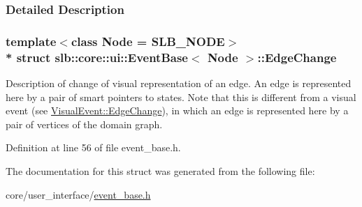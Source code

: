 \subsubsection{Detailed Description}
\subsubsection*{template$<$class Node = S\+L\+B\+\_\+\+N\+O\+DE$>$\\*
struct slb\+::core\+::ui\+::\+Event\+Base$<$ Node $>$\+::\+Edge\+Change}

Description of change of visual representation of an edge. An edge is represented here by a pair of smart pointers to states. Note that this is different from a visual event (see \hyperlink{structslb_1_1core_1_1ui_1_1VisualEvent_1_1EdgeChange}{Visual\+Event\+::\+Edge\+Change}), in which an edge is represented here by a pair of vertices of the domain graph. 

Definition at line 56 of file event\+\_\+base.\+h.



The documentation for this struct was generated from the following file\+:\begin{DoxyCompactItemize}
\item 
core/user\+\_\+interface/\hyperlink{event__base_8h}{event\+\_\+base.\+h}\end{DoxyCompactItemize}
